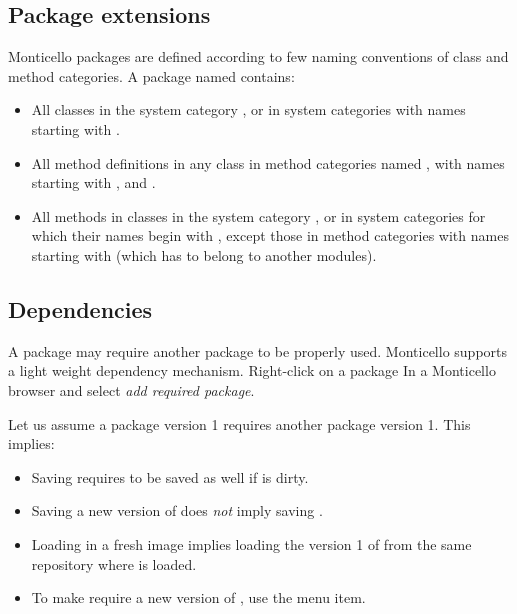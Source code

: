 \documentclass[a4paper,10pt,twoside]{book}
\begin{document}
\subsection{Package extensions}
Monticello packages are defined according to few naming conventions of class and method categories. A package named  contains:

\begin{itemize}
\item All classes in the system category , or in system categories with names starting with .
\item All method definitions in any class in method categories named , with names starting with ,  and .
\item All methods in classes in the system category , or in system categories for which their names begin with , except those in method categories with names starting with \prot{*} (which has to belong to another modules).
\end{itemize}

\subsection{Dependencies}

A package may require another package to be properly used. Monticello supports a light weight dependency mechanism. Right-click on a package In a Monticello browser and select \emph{add required package}.

Let us assume a package  version 1 requires another package  version 1. This implies:

\begin{itemize}
\item Saving  requires  to be saved as well if  is dirty.
\item Saving a new version of  does \emph{not} imply saving .
\item Loading  in a fresh image implies loading the version 1 of  from the same repository where  is loaded.
\item To make  require a new version of , use the  menu item.
\end{itemize}
\end{document}
